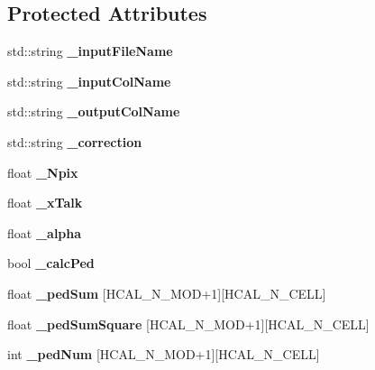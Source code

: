 \subsection*{Protected Attributes}
\begin{DoxyCompactItemize}
\item 
std\-::string {\bfseries \-\_\-input\-File\-Name}\label{classCALICE_1_1SimpleHcalCalibrationProcessor_ada93508b2a02a9a4dab8b5ce5e8ffe8a}

\item 
std\-::string {\bfseries \-\_\-input\-Col\-Name}\label{classCALICE_1_1SimpleHcalCalibrationProcessor_ae474eee8b25a5bfdf2132f87ff548b60}

\item 
std\-::string {\bfseries \-\_\-output\-Col\-Name}\label{classCALICE_1_1SimpleHcalCalibrationProcessor_ad93fe1c519b7f99ad86a6ec1f624d39b}

\item 
std\-::string {\bfseries \-\_\-correction}\label{classCALICE_1_1SimpleHcalCalibrationProcessor_af698bdfb5a6b93d1d1034a253392a4ee}

\item 
float {\bfseries \-\_\-\-Npix}\label{classCALICE_1_1SimpleHcalCalibrationProcessor_a780cf082fc115f8550d59f9702e532be}

\item 
float {\bfseries \-\_\-x\-Talk}\label{classCALICE_1_1SimpleHcalCalibrationProcessor_a441b3b542c04f43d466fed83f85563d5}

\item 
float {\bfseries \-\_\-alpha}\label{classCALICE_1_1SimpleHcalCalibrationProcessor_a0f42d4efbe64af7ad6f99c6f661b7aa5}

\item 
bool {\bfseries \-\_\-calc\-Ped}\label{classCALICE_1_1SimpleHcalCalibrationProcessor_a33e3edf193d34df72346964fbec120fc}

\item 
float {\bfseries \-\_\-ped\-Sum} [H\-C\-A\-L\-\_\-\-N\-\_\-\-M\-O\-D+1][H\-C\-A\-L\-\_\-\-N\-\_\-\-C\-E\-L\-L]\label{classCALICE_1_1SimpleHcalCalibrationProcessor_ae10ee914952e85b65190db373434d280}

\item 
float {\bfseries \-\_\-ped\-Sum\-Square} [H\-C\-A\-L\-\_\-\-N\-\_\-\-M\-O\-D+1][H\-C\-A\-L\-\_\-\-N\-\_\-\-C\-E\-L\-L]\label{classCALICE_1_1SimpleHcalCalibrationProcessor_a6ebcb182a15e4ee35546f46f546c2aa6}

\item 
int {\bfseries \-\_\-ped\-Num} [H\-C\-A\-L\-\_\-\-N\-\_\-\-M\-O\-D+1][H\-C\-A\-L\-\_\-\-N\-\_\-\-C\-E\-L\-L]\label{classCALICE_1_1SimpleHcalCalibrationProcessor_a5159b526798ba64ed5e8ba6a53e172da}


\end{DoxyCompactItemize}
